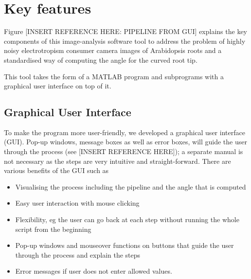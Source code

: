 \section{Key features} %

Figure [INSERT REFERENCE HERE: PIPELINE FROM GUI] explains the key components of this image-analysis software tool to address the problem of highly noisy electrotropism consumer camera images of Arabidopsis roots and a standardised way of computing the angle for the curved root tip. 

This tool takes the form of a MATLAB program and subprograms with a graphical user interface on top of it.

\subsection{Graphical User Interface}
To make the program more user-friendly, we developed a graphical user interface (GUI). Pop-up windows, message boxes as well as error boxes, will guide the user through the process (see [INSERT REFERENCE HERE]); a separate manual is not necessary as the steps are very intuitive and straight-forward.
There are various benefits of the GUI such as
\begin{itemize}
	\item Visualising the process including the pipeline and the angle that is computed
	\item Easy user interaction with mouse clicking
	\item Flexibility, eg the user can go back at each step without running the whole script from the beginning
	\item Pop-up windows and mouseover functions on buttons that guide the user through the process and explain the steps
	\item Error messages if user does not enter allowed values.
\end{itemize}


%


